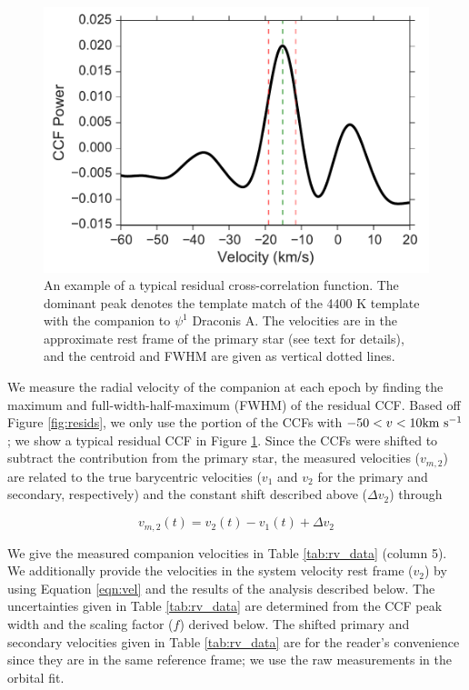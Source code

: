 \documentclass[twocolumn]{emulateapj}
\begin{document}
\begin{figure}
  \centering
  \includegraphics[width=\columnwidth]{Typical_CCF.pdf}
  \caption{An example of a typical residual cross-correlation function. The dominant peak denotes the template match of the 4400 K template with the companion to $\psi^1$ Draconis A. The velocities are in the approximate rest frame of the primary star (see text for details), and the centroid and FWHM are given as vertical dotted lines.}
  \label{fig:ccf_typical}
\end{figure}




We measure the radial velocity of the companion at each epoch by finding the maximum and full-width-half-maximum (FWHM) of the residual CCF. Based off Figure \ref{fig:resids}, we only use the portion of the CCFs with $-50 < v < 10 \rm km\ s^{-1}$; we show a typical residual CCF in Figure \ref{fig:ccf_typical}. Since the CCFs were shifted to subtract the contribution from the primary star, the measured velocities ($v_{m, 2}$) are related to the true barycentric velocities ($v_1$ and $v_2$ for the primary and secondary, respectively) and the constant shift described above ($\Delta v_2$) through

\begin{equation}
v_{m, 2}(t) = v_2(t) - v_1(t) + \Delta v_2
\label{eqn:vel}
\end{equation}

We give the measured companion velocities in Table \ref{tab:rv_data} (column 5). We additionally provide the velocities in the system velocity rest frame ($v_2$) by using Equation \ref{eqn:vel} and the results of the analysis described below. The uncertainties given in Table \ref{tab:rv_data} are determined from the CCF peak width and the scaling factor ($f$) derived below. The shifted primary and secondary velocities given in Table \ref{tab:rv_data} are for the reader's convenience since they are in the same reference frame; we use the raw measurements in the orbital fit.
\end{document}
